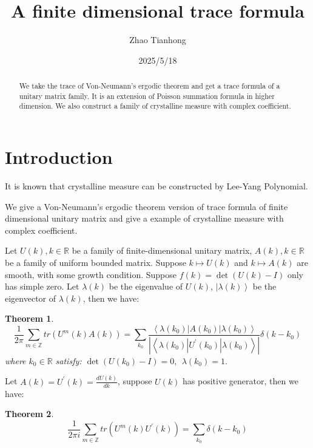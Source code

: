 \documentclass[draft]{article}
\title{A finite dimensional trace formula}
\author{Zhao Tianhong}%
\date{2025/5/18}
\newtheorem{thm}{Theorem}[section]
\theoremstyle{definition}
\theoremstyle{remark}
\newcommand{\R}{\mathbb{R}}
\newcommand{\Z}{\mathbb{Z}}
\begin{document}
	\maketitle
\begin{abstract}
We take the trace of Von-Neumann's ergodic theorem and get a trace formula of a unitary matrix family. It is an extension of Poisson summation formula in higher dimension. We also construct a family of crystalline measure with complex coefficient.
\end{abstract}

\section{Introduction}
  It is known that crystalline measure\cite{cry}\cite{meyer2023crystalline} can be constructed by Lee-Yang Polynomial.

 We give a Von-Neumann's ergodic theorem version of trace formula\cite{lenz2009continuity}\cite{silva1998trace} of finite dimensional unitary matrix and give a example of crystalline measure with complex coefficient.

Let $U\left(k\right),k\in \R$ be a family of finite-dimensional unitary matrix, $A\left(k\right),k\in \R$ be a family of uniform bounded matrix. Suppose $k \mapsto U\left(k\right)$ and $k \mapsto A\left(k\right)$ are smooth, with some growth condition. Suppose $f\left(k\right)=\det\left(U\left(k\right)-I\right)$ only has simple zero. Let $\lambda\left(k\right)$ be the eigenvalue of $U\left(k\right)$, $\left| \lambda\left(k\right) \right\rangle$ be the eigenvector of $\lambda\left(k\right)$, then we have:
\begin{thm}
	$$\frac{1}{2\pi}\sum_{m\in \Z}tr\left(U^m\left(k\right)A\left(k \right)  \right)= \sum_{k_0} \frac{\left \langle \lambda\left (k_0\right )  |A\left (k_0\right ) |\lambda\left (k_0\right )   \right \rangle }{\left | \left \langle \lambda\left (k_0\right )  |U^{'}\left (k_0\right ) |\lambda\left (k_0\right )   \right \rangle \right | }\delta\left(k-k_0\right) $$
	where $k_0\in \R$ satisfy: $\det\left(U\left(k_0\right)-I\right)=0, \ \ \lambda\left(k_0 \right)=1. $
\end{thm}
Let $A\left(k\right)=U^{'}\left(k\right)=\frac{dU\left(k\right)}{dk}$, suppose $U\left(k\right) $ has positive generator, then we have:
\begin{thm}
	$$\frac{1}{2\pi i}\sum_{m\in \Z}tr\left(U^m\left(k\right)U^{'}\left(k \right)  \right)= \sum_{k_0} \delta\left(k-k_0\right) $$
\end{thm}
\end{document}
